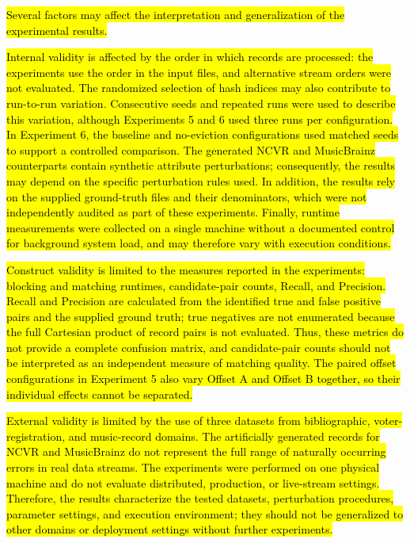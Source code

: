 \documentclass{ieeeaccess}
\begin{document}
\hl{Several factors may affect the interpretation and generalization of the experimental results.}

\hl{Internal validity is affected by the order in which records are processed: the experiments use the order in the input files, and alternative stream orders were not evaluated. The randomized selection of hash indices may also contribute to run-to-run variation. Consecutive seeds and repeated runs were used to describe this variation, although Experiments 5 and 6 used three runs per configuration. In Experiment 6, the baseline and no-eviction configurations used matched seeds to support a controlled comparison. The generated NCVR and MusicBrainz counterparts contain synthetic attribute perturbations; consequently, the results may depend on the specific perturbation rules used. In addition, the results rely on the supplied ground-truth files and their denominators, which were not independently audited as part of these experiments. Finally, runtime measurements were collected on a single machine without a documented control for background system load, and may therefore vary with execution conditions.}

\hl{Construct validity is limited to the measures reported in the experiments: blocking and matching runtimes, candidate-pair counts, Recall, and Precision. Recall and Precision are calculated from the identified true and false positive pairs and the supplied ground truth; true negatives are not enumerated because the full Cartesian product of record pairs is not evaluated. Thus, these metrics do not provide a complete confusion matrix, and candidate-pair counts should not be interpreted as an independent measure of matching quality. The paired offset configurations in Experiment 5 also vary Offset A and Offset B together, so their individual effects cannot be separated.}

\hl{External validity is limited by the use of three datasets from bibliographic, voter-registration, and music-record domains. The artificially generated records for NCVR and MusicBrainz do not represent the full range of naturally occurring errors in real data streams. The experiments were performed on one physical machine and do not evaluate distributed, production, or live-stream settings. Therefore, the results characterize the tested datasets, perturbation procedures, parameter settings, and execution environment; they should not be generalized to other domains or deployment settings without further experiments.}
\end{document}
